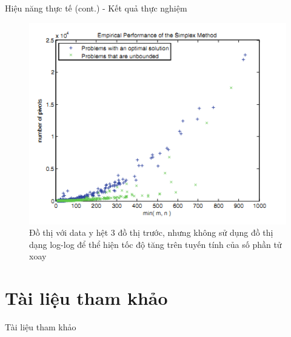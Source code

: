 \documentclass[10pt]{beamer}
\begin{document}
\begin{frame}[fragile]{Hiệu năng thực tế (cont.) - Kết quả thực nghiệm}
\begin{figure}
\includegraphics[scale=.5]{img/plot_4.png}
\caption{Đồ thị với data y hệt 3 đồ thị trước, nhưng không sử dụng đồ thị dạng log-log để thể hiện tốc độ tăng trên tuyến tính của số phần tử xoay}
\end{figure}
\end{frame}

\section{Tài liệu tham khảo}
\begin{frame}[allowframebreaks]{Tài liệu tham khảo}
\printbibliography
\end{frame}
\end{document}
